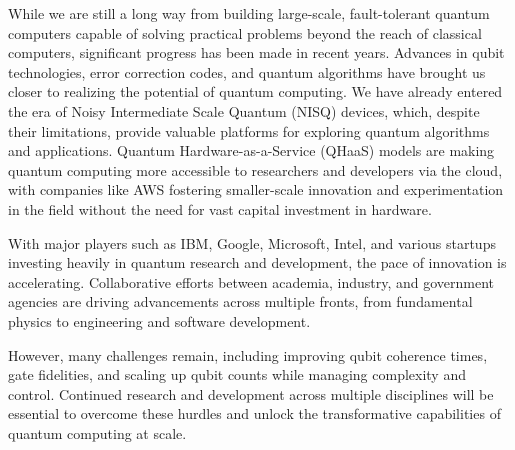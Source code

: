\documentclass{elbioimp2}
\begin{document}
While we are still a long way from building large-scale, fault-tolerant quantum computers capable of solving practical problems beyond the reach of classical computers, significant progress has been made in recent years. Advances in qubit technologies, error correction codes, and quantum algorithms have brought us closer to realizing the potential of quantum computing. We have already entered the era of Noisy Intermediate Scale Quantum (NISQ) devices, which, despite their limitations, provide valuable platforms for exploring quantum algorithms and applications. Quantum Hardware-as-a-Service (QHaaS) models are making quantum computing more accessible to researchers and developers via the cloud, with companies like AWS fostering smaller-scale innovation and experimentation in the field without the need for vast capital investment in hardware.

With major players such as IBM, Google, Microsoft, Intel, and various startups investing heavily in quantum research and development, the pace of innovation is accelerating. Collaborative efforts between academia, industry, and government agencies are driving advancements across multiple fronts, from fundamental physics to engineering and software development.

However, many challenges remain, including improving qubit coherence times, gate fidelities, and scaling up qubit counts while managing complexity and control. Continued research and development across multiple disciplines will be essential to overcome these hurdles and unlock the transformative capabilities of quantum computing at scale.


\nocite{*}

\printbibliography[heading=bibintoc,title={References}]
\end{document}
